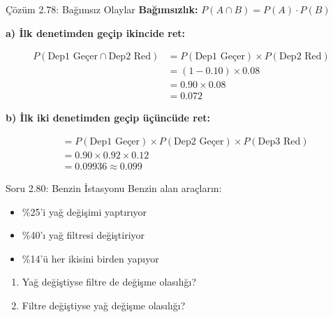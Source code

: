 \documentclass[light]{lutbeamer}
\begin{document}
\begin{frame}{Çözüm 2.78: Bağımsız Olaylar}
    \color{blue}
    \textbf{Bağımsızlık:} $P(A \cap B) = P(A) \cdot P(B)$
    
    \vspace{0.3cm}
    \textbf{a) İlk denetimden geçip ikincide ret:}
    
    \begin{align*}
    P(\text{Dep1 Geçer} \cap \text{Dep2 Red}) &= P(\text{Dep1 Geçer}) \times P(\text{Dep2 Red}) \\
    &= (1 - 0.10) \times 0.08 \\
    &= 0.90 \times 0.08 \\
    &= 0.072
    \end{align*}
    
    \vspace{0.3cm}
    \textbf{b) İlk iki denetimden geçip üçüncüde ret:}
    
    \begin{align*}
    &= P(\text{Dep1 Geçer}) \times P(\text{Dep2 Geçer}) \times P(\text{Dep3 Red}) \\
    &= 0.90 \times 0.92 \times 0.12 \\
    &= 0.09936 \approx 0.099
    \end{align*}
\end{frame}

\begin{frame}{Soru 2.80: Benzin İstasyonu}
    Benzin alan araçların:
    \begin{itemize}
        \item \%25'i yağ değişimi yaptırıyor
        \item \%40'ı yağ filtresi değiştiriyor
        \item \%14'ü her ikisini birden yapıyor
    \end{itemize}
    
    \begin{enumerate}
        \item Yağ değiştiyse filtre de değişme olasılığı?
        \item Filtre değiştiyse yağ değişme olasılığı?
    \end{enumerate}
\end{frame}
\end{document}
